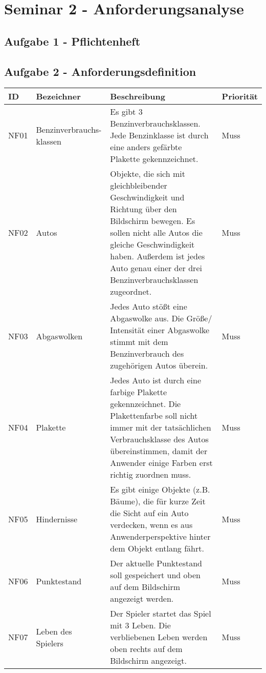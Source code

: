 
\section{Seminar 2 - Anforderungsanalyse}

\subsection{Aufgabe 1 - Pflichtenheft}

\subsection{Aufgabe 2 - Anforderungsdefinition}
\begin{center}
	\begin{tabular}{|m{1cm}|m{4cm}|m{8cm}|m{2cm}|}
		\hline
		ID & Bezeichner & Beschreibung & Priorität \\
		\hline
		NF01 & Benzinverbrauchs-klassen & Es gibt 3 Benzinverbrauchsklassen. Jede Benzinklasse ist durch eine anders gefärbte Plakette gekennzeichnet. & Muss \\
		\hline
		NF02 & Autos & Objekte, die sich mit gleichbleibender Geschwindigkeit und Richtung über den Bildschirm bewegen. Es sollen nicht alle Autos die gleiche Geschwindigkeit haben. Außerdem ist jedes Auto genau einer der drei Benzinverbrauchsklassen zugeordnet. & Muss \\
		\hline
		NF03 & Abgaswolken & Jedes Auto stößt eine Abgaswolke aus. Die Größe/ Intensität einer Abgaswolke stimmt mit dem Benzinverbrauch des zugehörigen Autos überein. & Muss \\
		\hline
		NF04 & Plakette & Jedes Auto ist durch eine farbige Plakette gekennzeichnet. Die Plakettenfarbe soll nicht immer mit der tatsächlichen Verbrauchsklasse des Autos übereinstimmen, damit der Anwender einige Farben erst richtig zuordnen muss. & Muss \\
		\hline 
		NF05 & Hindernisse & Es gibt einige Objekte (z.B. Bäume), die für kurze Zeit die Sicht auf ein Auto verdecken, wenn es aus Anwenderperspektive hinter dem Objekt entlang fährt. & Muss \\
		\hline
		NF06 & Punktestand & Der aktuelle Punktestand soll gespeichert und oben auf dem Bildschirm angezeigt werden. & Muss \\
		\hline
		NF07 & Leben des Spielers & Der Spieler startet das Spiel mit 3 Leben. Die verbliebenen Leben werden oben rechts auf dem Bildschirm angezeigt. & Muss \\

\end{tabular}
\end{center}
